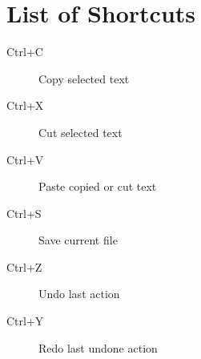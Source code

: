 
\section*{List of Shortcuts}

\begin{description}
    \item[Ctrl+C] Copy selected text
    \item[Ctrl+X] Cut selected text
    \item[Ctrl+V] Paste copied or cut text
    \item[Ctrl+S] Save current file
    \item[Ctrl+Z] Undo last action
    \item[Ctrl+Y] Redo last undone action
\end{description}